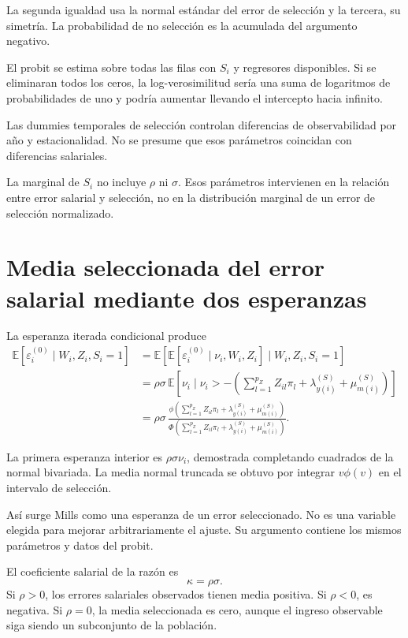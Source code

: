 \documentclass[11pt,a4paper]{article}
\newcommand{\E}{\mathbb E}
\begin{document}
La segunda igualdad usa la normal estándar del error de selección y la tercera, su simetría. La probabilidad de no selección es la acumulada del argumento negativo.

El probit se estima sobre todas las filas con $S_i$ y regresores disponibles. Si se eliminaran todos los ceros, la log-verosimilitud sería una suma de logaritmos de probabilidades de uno y podría aumentar llevando el intercepto hacia infinito.

Las dummies temporales de selección controlan diferencias de observabilidad por año y estacionalidad. No se presume que esos parámetros coincidan con diferencias salariales.

La marginal de $S_i$ no incluye $\rho$ ni $\sigma$. Esos parámetros intervienen en la relación entre error salarial y selección, no en la distribución marginal de un error de selección normalizado.

\clearpage
\section{Media seleccionada del error salarial mediante dos esperanzas}
La esperanza iterada condicional produce
\[
\begin{aligned}
\E[\varepsilon_i^{(0)}\mid W_i,Z_i,S_i=1]
&=\E[\E[\varepsilon_i^{(0)}\mid\nu_i,W_i,Z_i]\mid W_i,Z_i,S_i=1]\\
&=\rho\sigma\,\E[\nu_i\mid\nu_i>-(\sum_{l=1}^{p_Z}Z_{il}\pi_l+\lambda_{y(i)}^{(S)}+\mu_{m(i)}^{(S)})]\\
&=\rho\sigma\,\frac{\phi\!\left(\sum_{l=1}^{p_Z}Z_{il}\pi_l+\lambda_{y(i)}^{(S)}+\mu_{m(i)}^{(S)}\right)}{\Phi\!\left(\sum_{l=1}^{p_Z}Z_{il}\pi_l+\lambda_{y(i)}^{(S)}+\mu_{m(i)}^{(S)}\right)}.
\end{aligned}
\]

La primera esperanza interior es $\rho\sigma\nu_i$, demostrada completando cuadrados de la normal bivariada. La media normal truncada se obtuvo por integrar $v\phi(v)$ en el intervalo de selección.

Así surge Mills como una esperanza de un error seleccionado. No es una variable elegida para mejorar arbitrariamente el ajuste. Su argumento contiene los mismos parámetros y datos del probit.

El coeficiente salarial de la razón es
\[
\kappa=\rho\sigma.
\]
Si $\rho>0$, los errores salariales observados tienen media positiva. Si $\rho<0$, es negativa. Si $\rho=0$, la media seleccionada es cero, aunque el ingreso observable siga siendo un subconjunto de la población.
\end{document}
